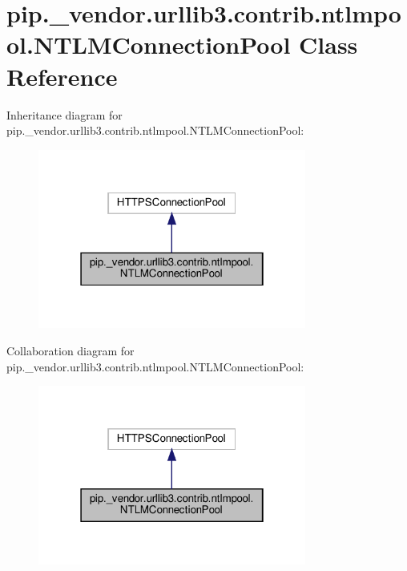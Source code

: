 \hypertarget{classpip_1_1__vendor_1_1urllib3_1_1contrib_1_1ntlmpool_1_1NTLMConnectionPool}{}\section{pip.\+\_\+vendor.\+urllib3.\+contrib.\+ntlmpool.\+N\+T\+L\+M\+Connection\+Pool Class Reference}
\label{classpip_1_1__vendor_1_1urllib3_1_1contrib_1_1ntlmpool_1_1NTLMConnectionPool}


Inheritance diagram for pip.\+\_\+vendor.\+urllib3.\+contrib.\+ntlmpool.\+N\+T\+L\+M\+Connection\+Pool\+:
\nopagebreak
\begin{figure}[H]
\begin{center}
\leavevmode
\includegraphics[width=250pt]{classpip_1_1__vendor_1_1urllib3_1_1contrib_1_1ntlmpool_1_1NTLMConnectionPool__inherit__graph}
\end{center}
\end{figure}


Collaboration diagram for pip.\+\_\+vendor.\+urllib3.\+contrib.\+ntlmpool.\+N\+T\+L\+M\+Connection\+Pool\+:
\nopagebreak
\begin{figure}[H]
\begin{center}
\leavevmode
\includegraphics[width=250pt]{classpip_1_1__vendor_1_1urllib3_1_1contrib_1_1ntlmpool_1_1NTLMConnectionPool__coll__graph}
\end{center}
\end{figure}
